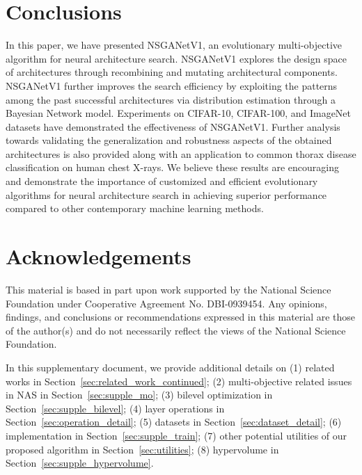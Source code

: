 \documentclass[journal]{IEEEtran}
\def\ourmethod{NSGANetV1}
\theoremstyle{definition}
\theoremstyle{remark}
\begin{document}
 \section{Conclusions\label{sec:conclusion}}
In this paper, we have presented \ourmethod{}, an evolutionary multi-objective algorithm for neural architecture search. \ourmethod{} explores the design space of architectures through recombining and mutating architectural components. \ourmethod{} further improves the search efficiency by exploiting the patterns among the past successful architectures via {distribution estimation through a Bayesian Network model.} Experiments on CIFAR-10, CIFAR-100, and ImageNet datasets have demonstrated the effectiveness of \ourmethod{}. Further analysis towards validating the generalization and robustness aspects of the obtained architectures is also provided along with an application to common thorax disease classification on human chest X-rays. We believe these results are encouraging {and demonstrate
the importance of customized and efficient evolutionary algorithms for neural architecture search in achieving superior performance compared to other contemporary machine learning methods.}
 
\section*{Acknowledgements}
This material is based in part upon work supported by the National Science Foundation under Cooperative Agreement No. DBI-0939454. Any opinions, findings, and conclusions or recommendations expressed in this material are those of the author(s) and do not necessarily reflect the views of the National Science Foundation.

\ifCLASSOPTIONcaptionsoff
  \newpage
\fi




\appendix
In this supplementary document, we provide additional details on (1) related works in Section~\ref{sec:related_work_continued}; (2) multi-objective related issues in NAS in Section~\ref{sec:supple_mo}; (3) bilevel optimization in Section~\ref{sec:supple_bilevel}; (4) layer operations in Section~\ref{sec:operation_detail}; (5) datasets in Section~\ref{sec:dataset_detail}; (6) implementation in Section~\ref{sec:supple_train}; (7) other potential utilities of our proposed algorithm in Section~\ref{sec:utilities}; (8) hypervolume in Section~\ref{sec:supple_hypervolume}.
\end{document}
